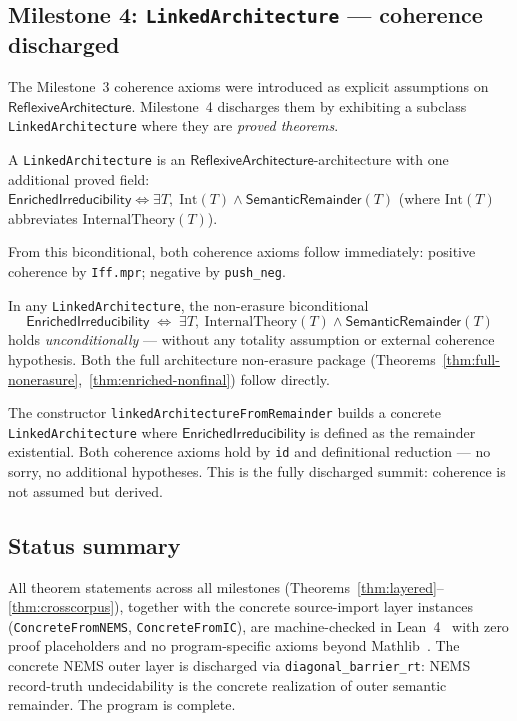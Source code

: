 \documentclass[11pt]{article}
\newcommand{\SemRem}{\ensuremath{\mathsf{SemanticRemainder}}}
\newcommand{\RAL}{\ensuremath{\mathsf{ReflexiveArchitecture}}}
\newcommand{\EnrIrr}{\ensuremath{\mathsf{EnrichedIrreducibility}}}
\begin{document}
\subsection{Milestone 4: \texttt{LinkedArchitecture} --- coherence discharged}

The Milestone~3 coherence axioms were introduced as explicit assumptions on $\RAL$.
Milestone~4 discharges them by exhibiting a subclass \texttt{LinkedArchitecture} where
they are \emph{proved theorems}.

\begin{definition}
\label{def:linked}\sloppy
A \texttt{LinkedArchitecture} is an $\RAL$-architecture with one additional proved field:
$\EnrIrr \iff \exists T,\; \mathrm{Int}(T) \wedge \SemRem(T)$
(where $\mathrm{Int}(T)$ abbreviates $\mathrm{InternalTheory}(T)$).
\end{definition}

From this biconditional, both coherence axioms follow immediately: positive coherence
by \texttt{Iff.mpr}; negative by \texttt{push\_neg}.

\begin{theorem}
\label{thm:linked}
In any \texttt{LinkedArchitecture}, the non-erasure biconditional
\[
\EnrIrr \;\Longleftrightarrow\; \exists T,\ \mathrm{InternalTheory}(T) \wedge \SemRem(T)
\]
holds \emph{unconditionally} --- without any totality assumption or external coherence
hypothesis.  Both the full architecture non-erasure package
(Theorems~\ref{thm:full-nonerasure},~\ref{thm:enriched-nonfinal}) follow directly.
\par{}
\end{theorem}

The constructor \texttt{linkedArchitectureFromRemainder} builds a concrete
\texttt{LinkedArchitecture} where $\EnrIrr$ is defined as the remainder existential.
Both coherence axioms hold by \texttt{id} and definitional reduction --- no sorry, no
additional hypotheses.  This is the fully discharged summit: coherence is not assumed
but derived.

\subsection{Status summary}

All theorem statements across all milestones
(Theorems~\ref{thm:layered}--\ref{thm:crosscorpus}), together with the concrete
source-import layer instances (\texttt{ConcreteFromNEMS}, \texttt{ConcreteFromIC}),
are machine-checked in Lean~4~\cite{deMouraUllrich2021} with zero proof placeholders and no program-specific
axioms beyond Mathlib~\cite{Mathlib2020}.  The concrete NEMS outer layer is
discharged via \texttt{diagonal\_barrier\_rt}: NEMS record-truth undecidability
is the concrete realization of outer semantic remainder.  The program is complete.
\end{document}
